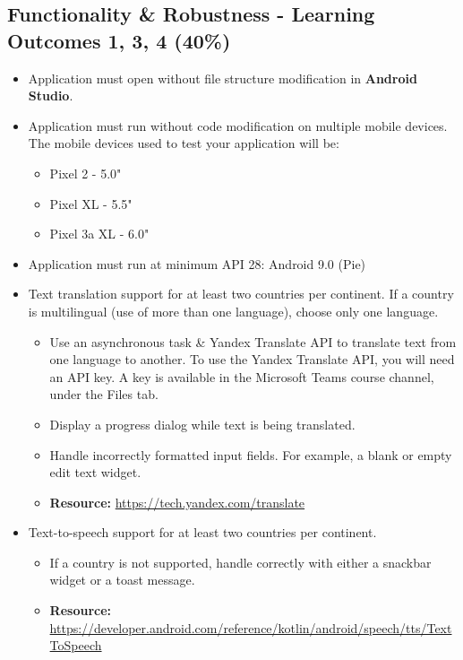 \documentclass{article}
\begin{document}
\subsection*{Functionality \& Robustness - Learning Outcomes 1, 3, 4 (40\%)}
\begin{itemize}
	\item Application must open without file structure modification in \textbf{Android Studio}.
	\item Application must run without code modification on multiple mobile devices. The mobile devices used to test your application will be:
	      \begin{itemize}
	      	\item Pixel 2 - 5.0"
	      	\item Pixel XL - 5.5"
	      	\item Pixel 3a XL - 6.0"
				\end{itemize}
	\item Application must run at minimum API 28: Android 9.0 (Pie)
	\item Text translation support for at least two countries per continent. If a country is multilingual (use of more than one language), choose only one language. 
	      \begin{itemize}
	      	\item Use an asynchronous task \& Yandex Translate API to translate text from one language to another. To use the Yandex Translate API, you will need an API key. A key is available in the Microsoft Teams course channel, under the Files tab.
	      	\item Display a progress dialog while text is being translated. 
	      	\item Handle incorrectly formatted input fields. For example, a blank or empty edit text widget.
	      	\item \textbf{Resource:} \footnotesize\href{https://tech.yandex.com/translate}{https://tech.yandex.com/translate}
	      \end{itemize}
	\item Text-to-speech support for at least two countries per continent. 
	      \begin{itemize}
	      	\item If a country is not supported, handle correctly with either a snackbar widget or a toast message.
	      	\item \textbf{Resource:} \footnotesize\href{https://developer.android.com/reference/kotlin/android/speech/tts/TextToSpeech}{https://developer.android.com/reference/kotlin/android/speech/tts/TextToSpeech} 

\end{itemize}
\end{itemize}
\end{document}
